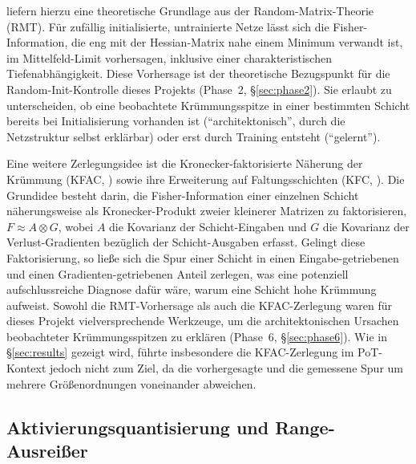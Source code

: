 \citet{karakida_fisher_2019} liefern hierzu eine theoretische Grundlage aus der Random-Matrix-Theorie (RMT). Für zufällig initialisierte, untrainierte Netze lässt sich die Fisher-Information, die eng mit der Hessian-Matrix nahe einem Minimum verwandt ist, im Mittelfeld-Limit vorhersagen, inklusive einer charakteristischen Tiefenabhängigkeit. Diese Vorhersage ist der theoretische Bezugspunkt für die Random-Init-Kontrolle dieses Projekts (Phase~2, \S\ref{sec:phase2}). Sie erlaubt zu unterscheiden, ob eine beobachtete Krümmungsspitze in einer bestimmten Schicht bereits bei Initialisierung vorhanden ist (\enquote{architektonisch}, durch die Netzstruktur selbst erklärbar) oder erst durch Training entsteht (\enquote{gelernt}).
\par\medskip

Eine weitere Zerlegungsidee ist die Kronecker-faktorisierte Näherung der Krümmung (KFAC, \citet{martens_kfac_2015}) sowie ihre Erweiterung auf Faltungsschichten (KFC, \citet{grosse_kfc_2016}). Die Grundidee besteht darin, die Fisher-Information einer einzelnen Schicht näherungsweise als Kronecker-Produkt zweier kleinerer Matrizen zu faktorisieren, $F \approx A \otimes G$, wobei $A$ die Kovarianz der Schicht-Eingaben und $G$ die Kovarianz der Verlust-Gradienten bezüglich der Schicht-Ausgaben erfasst. Gelingt diese Faktorisierung, so ließe sich die Spur einer Schicht in einen Eingabe-getriebenen und einen Gradienten-getriebenen Anteil zerlegen, was eine potenziell aufschlussreiche Diagnose dafür wäre, warum eine Schicht hohe Krümmung aufweist. Sowohl die RMT-Vorhersage als auch die KFAC-Zerlegung waren für dieses Projekt vielversprechende Werkzeuge, um die architektonischen Ursachen beobachteter Krümmungsspitzen zu erklären (Phase~6, \S\ref{sec:phase6}). Wie in \S\ref{sec:results} gezeigt wird, führte insbesondere die KFAC-Zerlegung im PoT-Kontext jedoch nicht zum Ziel, da die vorhergesagte und die gemessene Spur um mehrere Größenordnungen voneinander abweichen.

\subsection{Aktivierungsquantisierung und Range-Ausreißer}
\label{sec:fund-activation}

